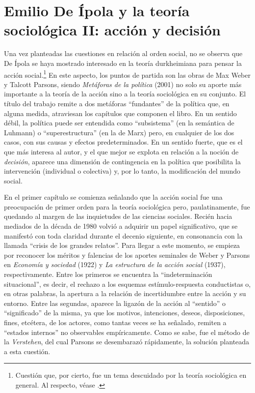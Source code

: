 {\section{Emilio De Ípola y la teoría sociológica II: acción y decisión}

Una vez planteadas las cuestiones en relación al orden social, no se observa que De Ípola se haya mostrado interesado en la teoría durkheimiana para pensar la acción social.\footnote{Cuestión que, por cierto, fue un tema descuidado por la teoría sociológica en general. Al respecto, véase \textcite{1698-LORENCVALCARCE2014}.} En este aspecto, los puntos de partida son las obras de Max Weber y Talcott Parsons, siendo \emph{Metáforas de la política} (2001) no solo su aporte más importante a la teoría de la acción sino a la teoría sociológica en su conjunto. El título del trabajo remite a dos metáforas \enquote{fundantes} de la política que, en alguna medida, atraviesan los capítulos que componen el libro. En un sentido débil, la política puede ser entendida como \enquote{subsistema} (en la semántica de Luhmann) o \enquote{superestructura} (en la de Marx) pero, en cualquier de los dos casos, con sus causas y efectos predeterminados. En un sentido fuerte, que es el que más interesa al autor, y el que mejor se explota en relación a la noción de \emph{decisión}, aparece una dimensión de contingencia en la política que posibilita la intervención (individual o colectiva) y, por lo tanto, la modificación del mundo social.

En el primer capítulo se comienza señalando que la acción social fue una preocupación de primer orden para la teoría sociológica pero, paulatinamente, fue quedando al margen de las inquietudes de las ciencias sociales. Recién hacia mediados de la década de 1980 volvió a adquirir un papel significativo, que se manifestó con toda claridad durante el decenio siguiente, en consonancia con la llamada \enquote{crisis de los grandes relatos}. Para llegar a este momento, se empieza por reconocer los méritos y falencias de los aportes seminales de Weber y Parsons en \emph{Economía y sociedad} (1922) y \emph{La estructura de la acción social} (1937), respectivamente. Entre los primeros se encuentra la \enquote{indeterminación situacional}, es decir, el rechazo a los esquemas estímulo-respuesta conductistas o, en otras palabras, la apertura a la relación de incertidumbre entre la acción y su entorno. Entre las segundas, aparece la ligazón de la acción al \enquote{sentido} o \enquote{significado} de la misma, ya que los motivos, intenciones, deseos, disposiciones, fines, etcétera, de los actores, como tantas veces se ha señalado, remiten a \enquote{estados internos} no observables empíricamente. Como se sabe, fue el método de la \emph{Verstehen}, del cual Parsons se desembarazó rápidamente, la solución planteada a esta cuestión.

}

